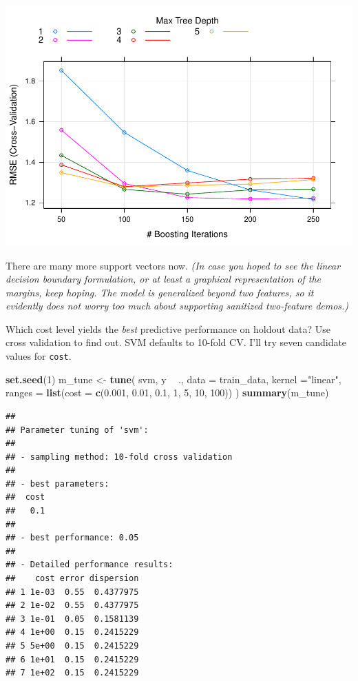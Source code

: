 \documentclass[
]{book}
\newenvironment{Shaded}{\begin{snugshade}}{\end{snugshade}}
\newcommand{\DataTypeTok}[1]{\textcolor[rgb]{0.13,0.29,0.53}{#1}}
\newcommand{\DecValTok}[1]{\textcolor[rgb]{0.00,0.00,0.81}{#1}}
\newcommand{\FloatTok}[1]{\textcolor[rgb]{0.00,0.00,0.81}{#1}}
\newcommand{\KeywordTok}[1]{\textcolor[rgb]{0.13,0.29,0.53}{\textbf{#1}}}
\newcommand{\NormalTok}[1]{#1}
\newcommand{\OperatorTok}[1]{\textcolor[rgb]{0.81,0.36,0.00}{\textbf{#1}}}
\newcommand{\StringTok}[1]{\textcolor[rgb]{0.31,0.60,0.02}{#1}}
\begin{document}
\includegraphics{data-sci_files/figure-latex/unnamed-chunk-121-1.pdf}

There are many more support vectors now. \emph{(In case you hoped to see the linear decision boundary formulation, or at least a graphical representation of the margins, keep hoping. The model is generalized beyond two features, so it evidently does not worry too much about supporting sanitized two-feature demos.)}

Which cost level yields the \emph{best} predictive performance on holdout data? Use cross validation to find out. SVM defaults to 10-fold CV. I'll try seven candidate values for \texttt{cost}.

\begin{Shaded}
\begin{Highlighting}[]
\KeywordTok{set.seed}\NormalTok{(}\DecValTok{1}\NormalTok{)}
\NormalTok{m_tune <-}\StringTok{ }\KeywordTok{tune}\NormalTok{(}
\NormalTok{  svm,}
\NormalTok{  y }\OperatorTok{~}\StringTok{ }\NormalTok{.,}
  \DataTypeTok{data =}\NormalTok{ train_data,}
  \DataTypeTok{kernel =}\StringTok{"linear"}\NormalTok{,}
  \DataTypeTok{ranges =} \KeywordTok{list}\NormalTok{(}\DataTypeTok{cost =} \KeywordTok{c}\NormalTok{(}\FloatTok{0.001}\NormalTok{, }\FloatTok{0.01}\NormalTok{, }\FloatTok{0.1}\NormalTok{, }\DecValTok{1}\NormalTok{, }\DecValTok{5}\NormalTok{, }\DecValTok{10}\NormalTok{, }\DecValTok{100}\NormalTok{))}
\NormalTok{)}
\KeywordTok{summary}\NormalTok{(m_tune)}
\end{Highlighting}
\end{Shaded}

\begin{verbatim}
## 
## Parameter tuning of 'svm':
## 
## - sampling method: 10-fold cross validation 
## 
## - best parameters:
##  cost
##   0.1
## 
## - best performance: 0.05 
## 
## - Detailed performance results:
##    cost error dispersion
## 1 1e-03  0.55  0.4377975
## 2 1e-02  0.55  0.4377975
## 3 1e-01  0.05  0.1581139
## 4 1e+00  0.15  0.2415229
## 5 5e+00  0.15  0.2415229
## 6 1e+01  0.15  0.2415229
## 7 1e+02  0.15  0.2415229
\end{verbatim}
\end{document}
